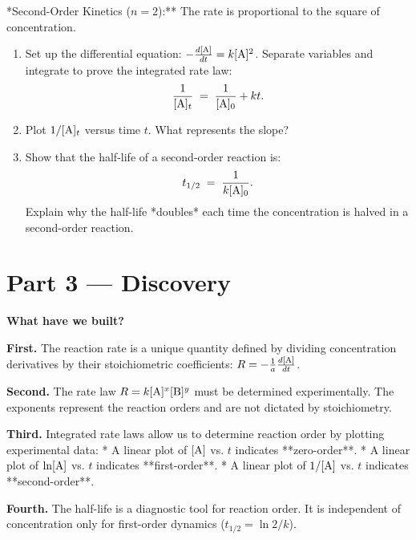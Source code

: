 \documentclass[12pt, a4paper]{book}
\begin{document}
\begin{explobox}
\problem **Second-Order Kinetics ($n=2$):** The rate is proportional to the square of concentration.
\begin{enumerate}[label=(\alph*), leftmargin=*]
  \item Set up the differential equation: $-\frac{d[\ce{A}]}{dt} = k[\ce{A}]^2$. Separate variables and integrate to prove the integrated rate law:
  \[
    \frac{1}{[\ce{A}]_t} \;=\; \frac{1}{[\ce{A}]_0} + kt.
  \]
  \item Plot $1/[\ce{A}]_t$ versus time $t$. What represents the slope?
  \item Show that the half-life of a second-order reaction is:
  \[
    t_{1/2} \;=\; \frac{1}{k [\ce{A}]_0}.
  \]
  Explain why the half-life *doubles* each time the concentration is halved in a second-order reaction.
\end{enumerate}
\end{explobox}

\newpage

\section{Part 3 --- Discovery}

\begin{discoverybox}
\textbf{What have we built?}

\textbf{First.} The reaction rate is a unique quantity defined by dividing concentration derivatives by their stoichiometric coefficients: $R = -\frac{1}{a}\frac{d[\ce{A}]}{dt}$.

\textbf{Second.} The rate law $R = k[\ce{A}]^x[\ce{B}]^y$ must be determined experimentally. The exponents represent the reaction orders and are not dictated by stoichiometry.

\textbf{Third.} Integrated rate laws allow us to determine reaction order by plotting experimental data:
* A linear plot of $[\ce{A}]$ vs. $t$ indicates **zero-order**.
* A linear plot of $\ln[\ce{A}]$ vs. $t$ indicates **first-order**.
* A linear plot of $1/[\ce{A}]$ vs. $t$ indicates **second-order**.

\textbf{Fourth.} The half-life is a diagnostic tool for reaction order. It is independent of concentration only for first-order dynamics ($t_{1/2} = \ln 2 / k$).
\end{discoverybox}

\newpage

\end{document}

